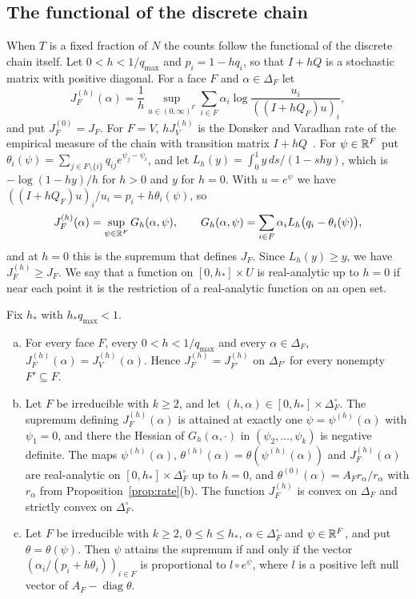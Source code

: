 \subsection{The functional of the discrete chain}\label{sec:discrete-rate}

When $T$ is a fixed fraction of $N$ the counts follow the functional of the
discrete chain itself. Let $0<h<1/q_{\max}$ and $p_i=1-hq_i$, so that $I+hQ$ is
a stochastic matrix with positive diagonal. For a face $F$ and
$\alpha\in\Delta_F$ let
\[
 J^{(h)}_F(\alpha)=\frac1h\sup_{u\in(0,\infty)^F}\sum_{i\in F}\alpha_i
 \log\frac{u_i}{((I+hQ_F)u)_i},
\]
and put $J^{(0)}_F=J_F$. For $F=V$, $hJ^{(h)}_V$ is the Donsker and Varadhan rate
of the empirical measure of the chain with transition matrix
$I+hQ$~\cite{dv1975}. For $\psi\in\mathbb{R}^F$ put
$\theta_i(\psi)=\sum_{j\in F\setminus\{i\}}q_{ij}e^{\psi_j-\psi_i}$, and let
$L_h(y)=\int_0^1y\,ds/(1-shy)$, which is $-\log(1-hy)/h$ for $h>0$ and $y$ for
$h=0$. With $u=e^\psi$ we have $((I+hQ_F)u)_i/u_i=p_i+h\theta_i(\psi)$, so
\[
 J^{(h)}_F(\alpha)=\sup_{\psi\in\mathbb{R}^F}G_h(\alpha,\psi),\qquad
 G_h(\alpha,\psi)=\sum_{i\in F}\alpha_iL_h\bigl(q_i-\theta_i(\psi)\bigr),
\]
and at $h=0$ this is the supremum that defines $J_F$. Since $L_h(y)\ge y$, we
have $J^{(h)}_F\ge J_F$. We say that a function on $[0,h_*]\times U$ is
real-analytic up to $h=0$ if near each point it is the restriction of a
real-analytic function on an open set.

\begin{proposition}\label{prop:discrete-rate}
Fix $h_*$ with $h_*q_{\max}<1$.
\begin{enumerate}[(a)]
\item For every face $F$, every $0<h<1/q_{\max}$ and every $\alpha\in\Delta_F$,
$J^{(h)}_F(\alpha)=J^{(h)}_V(\alpha)$. Hence $J^{(h)}_F=J^{(h)}_{F'}$ on
$\Delta_{F'}$ for every nonempty $F'\subseteq F$.
\item Let $F$ be irreducible with $k\ge2$, and let
$(h,\alpha)\in[0,h_*]\times\Delta_F^\circ$. The supremum defining
$J^{(h)}_F(\alpha)$ is attained at exactly one $\psi=\psi^{(h)}(\alpha)$ with
$\psi_1=0$, and there the Hessian of $G_h(\alpha,\cdot)$ in
$(\psi_2,\dots,\psi_k)$ is negative definite. The maps $\psi^{(h)}(\alpha)$,
$\theta^{(h)}(\alpha)=\theta(\psi^{(h)}(\alpha))$ and $J^{(h)}_F(\alpha)$ are
real-analytic on $[0,h_*]\times\Delta_F^\circ$ up to $h=0$, and
$\theta^{(0)}(\alpha)=A_Fr_\alpha/r_\alpha$ with $r_\alpha$ from
Proposition~\ref{prop:rate}(b). The function $J^{(h)}_F$ is convex on $\Delta_F$
and strictly convex on $\Delta_F^\circ$.
\item Let $F$ be irreducible with $k\ge2$, $0\le h\le h_*$,
$\alpha\in\Delta_F^\circ$ and $\psi\in\mathbb{R}^F$, and put $\theta=\theta(\psi)$. Then
$\psi$ attains the supremum if and only if the vector
$(\alpha_i/(p_i+h\theta_i))_{i\in F}$ is proportional to $l\circ e^\psi$, where
$l$ is a positive left null vector of $A_F-\operatorname{diag}\theta$.
\end{enumerate}
\end{proposition}

